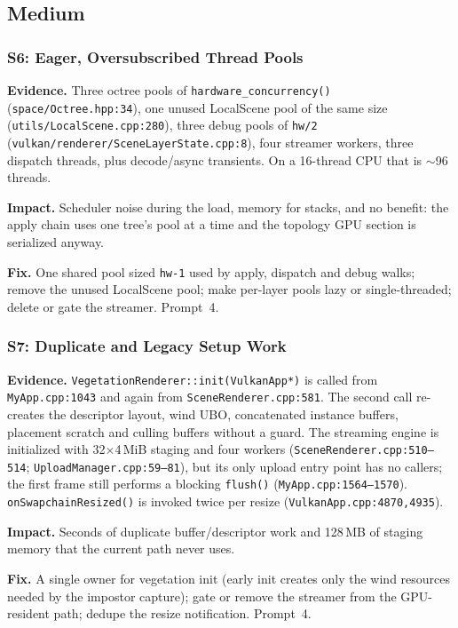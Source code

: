 \documentclass[11pt,a4paper]{article}
\begin{document}
\subsection{Medium}

\subsubsection*{S6: Eager, Oversubscribed Thread Pools}

\textbf{Evidence.} Three octree pools of \texttt{hardware\_concurrency()}
(\texttt{space/Octree.hpp:34}), one unused LocalScene pool of the same size
(\texttt{utils/LocalScene.cpp:280}), three debug pools of
\texttt{hw/2} (\texttt{vulkan/renderer/SceneLayerState.cpp:8}), four streamer
workers, three dispatch threads, plus decode/async transients. On a 16-thread
CPU that is $\sim$96 threads.

\textbf{Impact.} Scheduler noise during the load, memory for stacks, and no
benefit: the apply chain uses one tree's pool at a time and the topology GPU
section is serialized anyway.

\textbf{Fix.} One shared pool sized \texttt{hw-1} used by apply, dispatch and
debug walks; remove the unused LocalScene pool; make per-layer pools lazy or
single-threaded; delete or gate the streamer. Prompt~4.

\subsubsection*{S7: Duplicate and Legacy Setup Work}

\textbf{Evidence.} \texttt{VegetationRenderer::init(VulkanApp*)} is called
from \texttt{MyApp.cpp:1043} and again from
\texttt{SceneRenderer.cpp:581}. The second call re-creates the descriptor
layout, wind UBO, concatenated instance buffers, placement scratch and
culling buffers without a guard. The streaming engine is initialized with
32$\times$4\,MiB staging and four workers
(\texttt{SceneRenderer.cpp:510--514}; \texttt{UploadManager.cpp:59--81}), but
its only upload entry point has no callers; the first frame still performs a
blocking \texttt{flush()} (\texttt{MyApp.cpp:1564--1570}).
\texttt{onSwapchainResized()} is invoked twice per resize
(\texttt{VulkanApp.cpp:4870,4935}).

\textbf{Impact.} Seconds of duplicate buffer/descriptor work and 128\,MB of
staging memory that the current path never uses.

\textbf{Fix.} A single owner for vegetation init (early init creates only the
wind resources needed by the impostor capture); gate or remove the streamer
from the GPU-resident path; dedupe the resize notification. Prompt~4.
\end{document}
